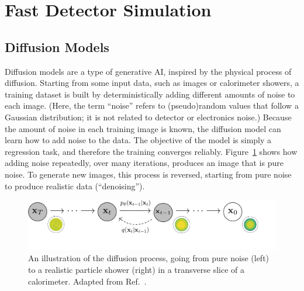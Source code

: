 \section{Fast Detector Simulation}\label{sec:ml4sim}

\subsection{Diffusion Models}\label{subsec:diffu}

Diffusion models are a type of generative AI, inspired by the physical process of diffusion.
Starting from some input data, such as images or calorimeter showers,
a training dataset is built by deterministically adding different amounts of noise to each image.
(Here, the term ``noise'' refers to (pseudo)random values that follow a Gaussian distribution;
it is not related to detector or electronics noise.)
Because the amount of noise in each training image is known, the diffusion model can learn how to add noise to the data.
The objective of the model is simply a regression task, and therefore the training converges reliably.
Figure~\ref{fig:illus} shows how adding noise repeatedly, over many iterations, produces an image that is pure noise.
To generate new images, this process is reversed, starting from pure noise to produce realistic data (``denoising'').

\begin{figure}[htb!]
\centering
\includegraphics[width=0.95\myfigurewidth]{figures/pgm_diagram_xarrow_showers.pdf}
\caption{An illustration of the diffusion process, going from pure noise (left) to a realistic particle shower (right) in a transverse slice of a calorimeter. Adapted from Ref.~\cite{Ho:2020}.}
\label{fig:illus}
\end{figure}


